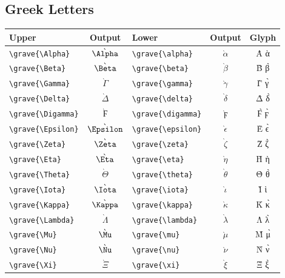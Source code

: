 \documentclass[12pt,a4paper]{article}
\begin{document}
\subsection*{Greek Letters}
\begin{longtable}{|l|c|l|c|c|}
\hline
\textbf{Upper}             & \textbf{Output}    & \textbf{Lower}             & \textbf{Output}       & \textbf{Glyph} \\
\hline
\verb|\grave{\Alpha}|      & $\grave{\Alpha}$   & \verb|\grave{\alpha}|      & $\grave{\alpha}$      & Ὰ ὰ \\
\verb|\grave{\Beta}|       & $\grave{\Beta}$    & \verb|\grave{\beta}|       & $\grave{\beta}$       & Β̀ β̀ \\
\verb|\grave{\Gamma}|      & $\grave{\Gamma}$   & \verb|\grave{\gamma}|      & $\grave{\gamma}$      & Γ̀ γ̀ \\
\verb|\grave{\Delta}|      & $\grave{\Delta}$   & \verb|\grave{\delta}|      & $\grave{\delta}$      & Δ̀ δ̀ \\
\verb|\grave{\Digamma}|    & $\grave{\Digamma}$ & \verb|\grave{\digamma}|    & $\grave{\digamma}$    & Ϝ̀ ϝ̀ \\
\verb|\grave{\Epsilon}|    & $\grave{\Epsilon}$ & \verb|\grave{\epsilon}|    & $\grave{\epsilon}$    & Ὲ ϵ̀ \\
\verb|\grave{\Zeta}|       & $\grave{\Zeta}$    & \verb|\grave{\zeta}|       & $\grave{\zeta}$       & Ζ̀ ζ̀ \\
\verb|\grave{\Eta}|        & $\grave{\Eta}$     & \verb|\grave{\eta}|        & $\grave{\eta}$        & Ὴ ὴ \\
\verb|\grave{\Theta}|      & $\grave{\Theta}$   & \verb|\grave{\theta}|      & $\grave{\theta}$      & Θ̀ θ̀ \\
\verb|\grave{\Iota}|       & $\grave{\Iota}$    & \verb|\grave{\iota}|       & $\grave{\iota}$       & Ὶ ὶ \\
\verb|\grave{\Kappa}|      & $\grave{\Kappa}$   & \verb|\grave{\kappa}|      & $\grave{\kappa}$      & Κ̀ κ̀ \\
\verb|\grave{\Lambda}|     & $\grave{\Lambda}$  & \verb|\grave{\lambda}|     & $\grave{\lambda}$     & Λ̀ λ̀ \\
\verb|\grave{\Mu}|         & $\grave{\Mu}$      & \verb|\grave{\mu}|         & $\grave{\mu}$         & Μ̀ μ̀ \\
\verb|\grave{\Nu}|         & $\grave{\Nu}$      & \verb|\grave{\nu}|         & $\grave{\nu}$         & Ν̀ ν̀ \\
\verb|\grave{\Xi}|         & $\grave{\Xi}$      & \verb|\grave{\xi}|         & $\grave{\xi}$         & Ξ̀ ξ̀ \\

\end{longtable}
\end{document}
